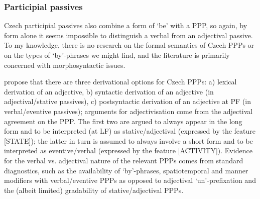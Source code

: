 \documentclass[output=paper,colorlinks,citecolor=brown]{langscibook}
\begin{document}
\subsubsection{Participial passives}
\label{sec:CZPPP}

Czech participial passives also combine a form of `be' with a PPP, so again, by form alone it seems impossible to distinguish a verbal from an adjectival passive. To my knowledge, there is no research on the formal semantics of Czech PPPs or on the types of `by'-phrases we might find, and the literature is primarily concerned with morphosyntactic issues. 

\citet{veselovskakarlik} propose that there are three derivational options for Czech PPPs: a) lexical derivation of an adjective, b) syntactic derivation of an adjective (in adjectival/stative passives), c) postsyntactic derivation of an adjective at PF (in verbal/eventive passives); arguments for adjectivisation come from the adjectival agreement on the PPP. The first two are argued to always appear in the long form and to be interpreted (at LF) as stative/adjectival (expressed by the feature [STATE]); the latter in turn is assumed to always involve a short form and to be interpreted as eventive/verbal (expressed by the feature [ACTIVITY]). %
Evidence for the verbal vs. adjectival nature of the relevant PPPs comes from standard diagnostics, such as the availability of `by'-phrases, spatiotemporal and manner modifiers with verbal/eventive PPPs as opposed to adjectival `un'-prefixation and the (albeit limited) gradability of stative/adjectival PPPs.
\end{document}
